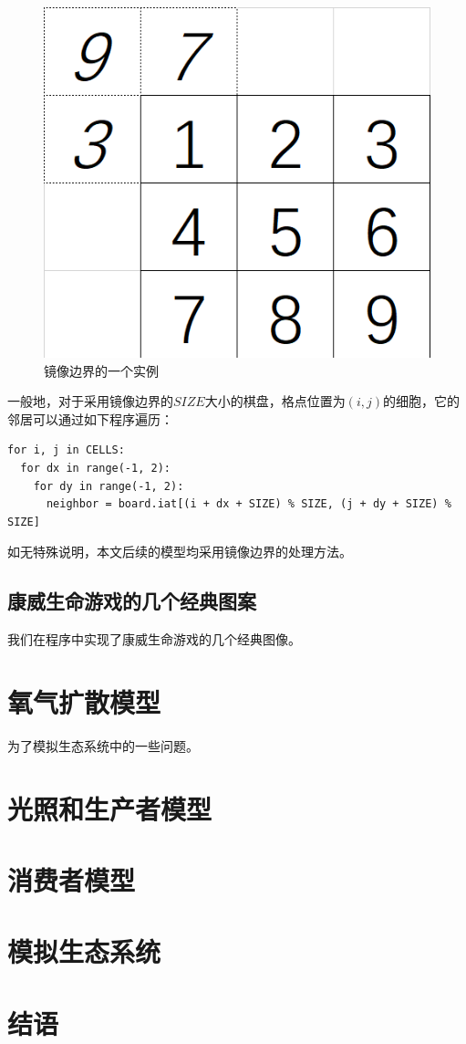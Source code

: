 \documentclass{ctexart}
\begin{document}
\begin{figure}[h]
  \centering
  \includegraphics[scale=0.75]{2.png}
  \caption{镜像边界的一个实例}
  \label{fig:2}
\end{figure}

一般地，对于采用镜像边界的$SIZE$大小的棋盘，格点位置为$(i, j)$的细胞，它的邻居可以通过如下程序遍历：

\begin{lstlisting}[style = python]
for i, j in CELLS:
  for dx in range(-1, 2):
    for dy in range(-1, 2):
      neighbor = board.iat[(i + dx + SIZE) % SIZE, (j + dy + SIZE) % SIZE]
\end{lstlisting}

如无特殊说明，本文后续的模型均采用镜像边界的处理方法。

\subsection{康威生命游戏的几个经典图案}

我们在程序中实现了康威生命游戏的几个经典图像。

\section{氧气扩散模型}

为了模拟生态系统中的一些问题。

\section{光照和生产者模型}

\section{消费者模型}

\section{模拟生态系统}

\section{结语}
\end{document}
